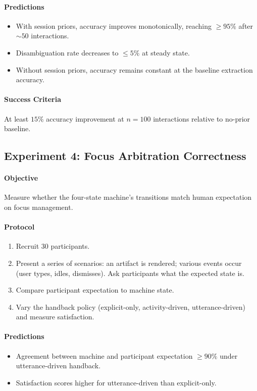 \documentclass[11pt,twocolumn,a4paper]{article}
\theoremstyle{definition}
\theoremstyle{remark}
\begin{document}
\paragraph{Predictions}
\begin{itemize}
    \item With session priors, accuracy improves monotonically, reaching $\geq 95\%$ after $\sim 50$ interactions.
    \item Disambiguation rate decreases to $\leq 5\%$ at steady state.
    \item Without session priors, accuracy remains constant at the baseline extraction accuracy.
\end{itemize}

\paragraph{Success Criteria}
At least $15\%$ accuracy improvement at $n = 100$ interactions relative to no-prior baseline.

\subsection{Experiment 4: Focus Arbitration Correctness}

\paragraph{Objective} Measure whether the four-state machine's transitions match human expectation on focus management.

\paragraph{Protocol}
\begin{enumerate}
    \item Recruit 30 participants.
    \item Present a series of scenarios: an artifact is rendered; various events occur (user types, idles, dismisses). Ask participants what the expected state is.
    \item Compare participant expectation to machine state.
    \item Vary the handback policy (explicit-only, activity-driven, utterance-driven) and measure satisfaction.
\end{enumerate}

\paragraph{Predictions}
\begin{itemize}
    \item Agreement between machine and participant expectation $\geq 90\%$ under utterance-driven handback.
    \item Satisfaction scores higher for utterance-driven than explicit-only.
\end{itemize}
\end{document}
